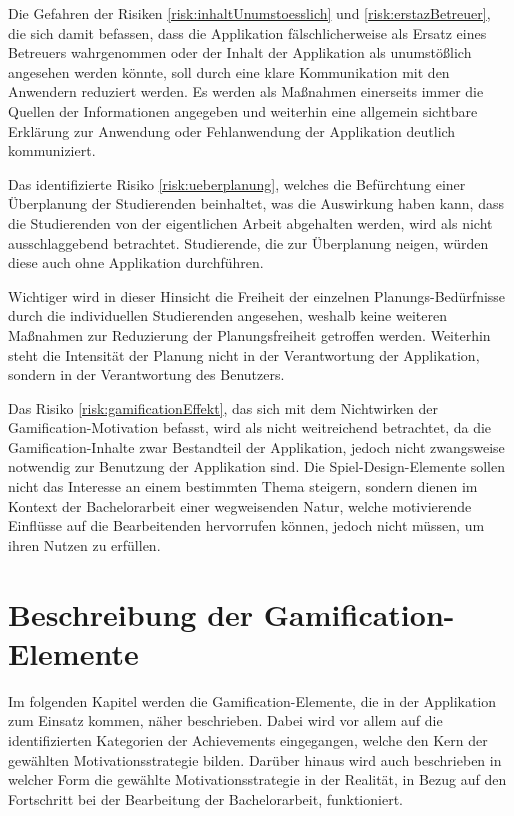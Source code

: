 \documentclass[bibliography=totoc,listof=totoc,BCOR=5mm,DIV=12,oneside]{scrbook}
\begin{document}
\par \medskip Die Gefahren der Risiken \ref{risk:inhaltUnumstoesslich} und \ref{risk:erstazBetreuer}, die sich damit befassen, dass die Applikation fälschlicherweise als Ersatz eines Betreuers wahrgenommen oder der Inhalt der Applikation als unumstößlich angesehen werden könnte, soll durch eine klare Kommunikation mit den Anwendern reduziert werden. Es werden als Maßnahmen einerseits immer die Quellen der Informationen angegeben und weiterhin eine allgemein sichtbare Erklärung zur Anwendung oder Fehlanwendung der Applikation deutlich kommuniziert.

\par \medskip  Das identifizierte Risiko \ref{risk:ueberplanung}, welches die Befürchtung einer Überplanung der Studierenden beinhaltet, was die Auswirkung haben kann, dass die Studierenden von der eigentlichen Arbeit abgehalten werden, wird als nicht ausschlaggebend betrachtet.
Studierende, die zur Überplanung neigen, würden diese auch ohne Applikation durchführen. 
\par Wichtiger wird in dieser Hinsicht die Freiheit der einzelnen Planungs-Bedürfnisse durch die individuellen Studierenden angesehen, weshalb keine weiteren Maßnahmen zur Reduzierung der Planungsfreiheit getroffen werden. Weiterhin steht die Intensität der Planung nicht in der Verantwortung der Applikation, sondern in der Verantwortung des Benutzers. 

\par \medskip Das Risiko \ref{risk:gamificationEffekt}, das sich mit dem Nichtwirken der Gamification-Motivation befasst, wird als nicht weitreichend betrachtet, da die Gamification-Inhalte zwar Bestandteil der Applikation, jedoch nicht zwangsweise notwendig zur Benutzung der Applikation sind. Die Spiel-Design-Elemente sollen nicht das Interesse an einem bestimmten Thema steigern, sondern dienen im Kontext der Bachelorarbeit einer wegweisenden Natur, welche motivierende Einflüsse auf die Bearbeitenden hervorrufen können, jedoch nicht müssen, um ihren Nutzen zu erfüllen. 


\newpage
\section{Beschreibung der Gamification-Elemente} \label{sec:gamificationelemente}
\par Im folgenden Kapitel werden die Gamification-Elemente, die in der Applikation zum Einsatz kommen, näher beschrieben. Dabei wird vor allem auf die identifizierten Kategorien der Achievements eingegangen, welche den Kern der gewählten Motivationsstrategie bilden. Darüber hinaus wird auch beschrieben in welcher Form die gewählte Motivationsstrategie in der Realität, in Bezug auf den Fortschritt bei der Bearbeitung der Bachelorarbeit, funktioniert.
\end{document}
